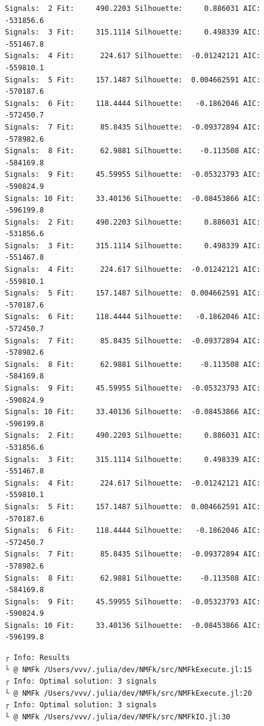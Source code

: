 \documentclass[11pt]{article}
\begin{document}
    \begin{Verbatim}[commandchars=\\\{\}]
Signals:  2 Fit:     490.2203 Silhouette:     0.886031 AIC:    -531856.6
Signals:  3 Fit:     315.1114 Silhouette:     0.498339 AIC:    -551467.8
Signals:  4 Fit:      224.617 Silhouette:  -0.01242121 AIC:    -559810.1
Signals:  5 Fit:     157.1487 Silhouette:  0.004662591 AIC:    -570187.6
Signals:  6 Fit:     118.4444 Silhouette:   -0.1862046 AIC:    -572450.7
Signals:  7 Fit:      85.8435 Silhouette:  -0.09372894 AIC:    -578982.6
Signals:  8 Fit:      62.9881 Silhouette:    -0.113508 AIC:    -584169.8
Signals:  9 Fit:     45.59955 Silhouette:  -0.05323793 AIC:    -590824.9
Signals: 10 Fit:     33.40136 Silhouette:  -0.08453866 AIC:    -596199.8
Signals:  2 Fit:     490.2203 Silhouette:     0.886031 AIC:    -531856.6
Signals:  3 Fit:     315.1114 Silhouette:     0.498339 AIC:    -551467.8
Signals:  4 Fit:      224.617 Silhouette:  -0.01242121 AIC:    -559810.1
Signals:  5 Fit:     157.1487 Silhouette:  0.004662591 AIC:    -570187.6
Signals:  6 Fit:     118.4444 Silhouette:   -0.1862046 AIC:    -572450.7
Signals:  7 Fit:      85.8435 Silhouette:  -0.09372894 AIC:    -578982.6
Signals:  8 Fit:      62.9881 Silhouette:    -0.113508 AIC:    -584169.8
Signals:  9 Fit:     45.59955 Silhouette:  -0.05323793 AIC:    -590824.9
Signals: 10 Fit:     33.40136 Silhouette:  -0.08453866 AIC:    -596199.8
Signals:  2 Fit:     490.2203 Silhouette:     0.886031 AIC:    -531856.6
Signals:  3 Fit:     315.1114 Silhouette:     0.498339 AIC:    -551467.8
Signals:  4 Fit:      224.617 Silhouette:  -0.01242121 AIC:    -559810.1
Signals:  5 Fit:     157.1487 Silhouette:  0.004662591 AIC:    -570187.6
Signals:  6 Fit:     118.4444 Silhouette:   -0.1862046 AIC:    -572450.7
Signals:  7 Fit:      85.8435 Silhouette:  -0.09372894 AIC:    -578982.6
Signals:  8 Fit:      62.9881 Silhouette:    -0.113508 AIC:    -584169.8
Signals:  9 Fit:     45.59955 Silhouette:  -0.05323793 AIC:    -590824.9
Signals: 10 Fit:     33.40136 Silhouette:  -0.08453866 AIC:    -596199.8
    \end{Verbatim}

    \begin{Verbatim}[commandchars=\\\{\}]
┌ Info: Results
└ @ NMFk /Users/vvv/.julia/dev/NMFk/src/NMFkExecute.jl:15
┌ Info: Optimal solution: 3 signals
└ @ NMFk /Users/vvv/.julia/dev/NMFk/src/NMFkExecute.jl:20
┌ Info: Optimal solution: 3 signals
└ @ NMFk /Users/vvv/.julia/dev/NMFk/src/NMFkIO.jl:30
    \end{Verbatim}
\end{document}
